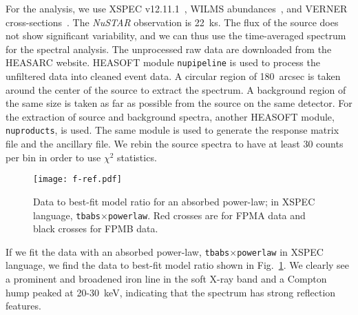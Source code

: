 \documentclass[twocolumn]{emulateapj}
\begin{document}
For the analysis, we use XSPEC v12.11.1~\citep{1996ASPC..101...17A}, WILMS abundances~\citep{2000ApJ...542..914W}, and VERNER cross-sections~\citep{1996ApJ...465..487V}. The \textsl{NuSTAR} observation is 22~ks. The flux of the source does not show significant variability, and we can thus use the time-averaged spectrum for the spectral analysis. The unprocessed raw data are downloaded from the HEASARC website. HEASOFT module {\tt nupipeline} is used to process the 
unfiltered data into cleaned event data. A circular region of 180~arcsec is taken around the center
of the source to extract the spectrum. A background region of the same size is taken as far as possible from the source on the same detector. For the extraction of source and background spectra, another HEASOFT module, {\tt nuproducts}, is used. The same module is used to generate the response matrix file and the ancillary file. We rebin the source spectra to have at least 30 counts per bin in order to use $\chi^2$ statistics. 


\begin{figure}[t]
\begin{center}
    \texttt{[image: f-ref.pdf]}
\end{center}
\vspace{-0.5cm}
    \caption{Data to best-fit model ratio for an absorbed power-law; in XSPEC language, {\tt tbabs$\times$powerlaw}. Red crosses are for FPMA data and black crosses for FPMB data. \label{f-ref}}
    \vspace{0.5cm}
\end{figure}


If we fit the data with an absorbed power-law, {\tt tbabs$\times$powerlaw} in XSPEC language, we find the data to best-fit model ratio shown in Fig.~\ref{f-ref}. We clearly see a prominent and broadened iron line in the soft X-ray band and a Compton hump peaked at 20-30~keV, indicating that the spectrum has strong reflection features.
\end{document}

